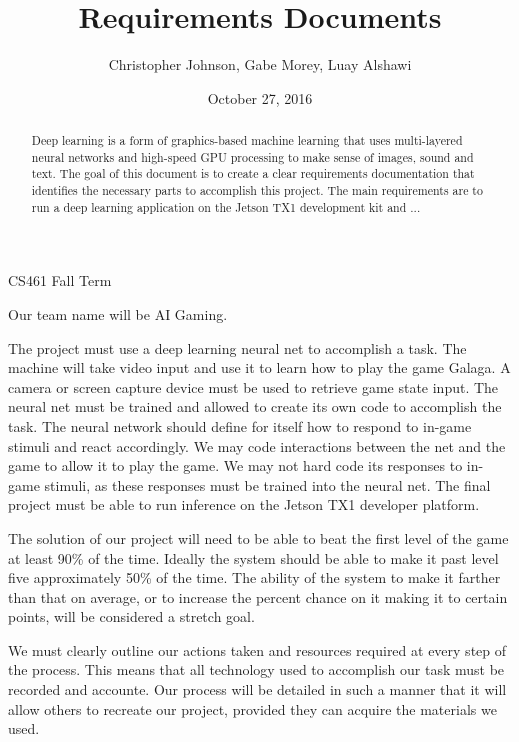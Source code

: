 \documentclass[letterpaper,10pt]{article}
\author{Christopher Johnson, Gabe Morey, Luay Alshawi}
\title{Requirements Documents}
\date{October 27, 2016}
\begin{document}
\begin{titlingpage}
\maketitle
CS461 Fall Term

\begin{abstract}
Deep learning is a form of graphics-based machine learning that uses multi-layered neural networks and high-speed GPU processing to make sense of images, sound and text. 
The goal of this document is to create a clear requirements documentation that identifies the necessary parts to accomplish this project. 
The main requirements are to run a deep learning application on the Jetson TX1 development kit and ...
\end{abstract}

\end{titlingpage}
Our team name will be AI Gaming.


The project must use a deep learning neural net to accomplish a task.
The machine will take video input and use it to learn how to play the game Galaga.
A camera or screen capture device must be used to retrieve game state input.
The neural net must be trained and allowed to create its own code to accomplish the task.
The neural network should define for itself how to respond to in-game stimuli and react accordingly.
We may code interactions between the net and the game to allow it to play the game.
We may not hard code its responses to in-game stimuli, as these responses must be trained into the neural net.
The final project must be able to run inference on the Jetson TX1 developer platform.

The solution of our project will need to be able to beat the first level of the game at least 90\% of the time.
Ideally the system should be able to make it past level five approximately 50\% of the time.
The ability of the system to make it farther than that on average, or to increase the percent chance on it making it to certain points, will be considered a stretch goal.

We must clearly outline our actions taken and resources required at every step of the process.
This means that all technology used to accomplish our task must be recorded and accounte.
Our process will be detailed in such a manner that it will allow others to recreate our project, provided they can acquire the materials we used.
\end{document}
